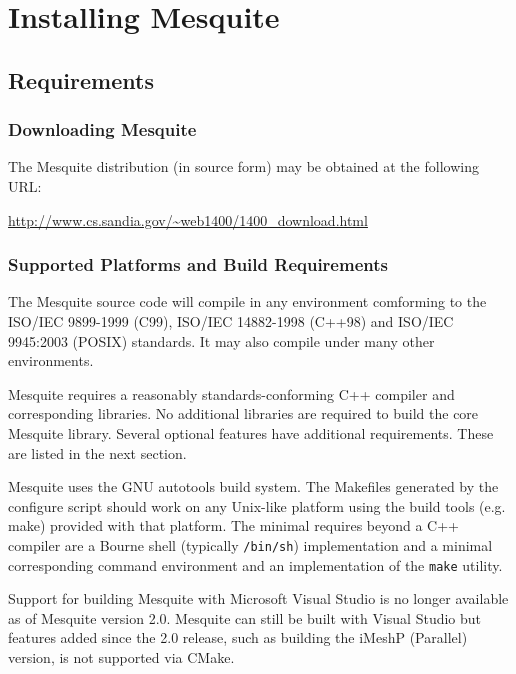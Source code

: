 \chapter{Installing Mesquite} \label{sec:install}

\section{Requirements}

\subsection{Downloading Mesquite}
The Mesquite distribution (in source form) may be obtained at the following URL:
\begin{center}
\url{http://www.cs.sandia.gov/~web1400/1400\_download.html}
\end{center}

\subsection{Supported Platforms and Build Requirements}
The Mesquite source code will compile in any environment comforming to the ISO/IEC 9899-1999 (C99), ISO/IEC 14882-1998 (C++98) and ISO/IEC 9945:2003 (POSIX) standards. It may also compile under many other environments.

Mesquite requires a reasonably standards-conforming C++ compiler and corresponding libraries.  No additional libraries are required to build the core Mesquite library. Several optional features have additional requirements.  These are listed in the next section.

Mesquite uses the GNU autotools build system.  The Makefiles generated by the
configure script should work on any Unix-like platform using the build tools
(e.g. make) provided with that platform.  The minimal requires beyond a C++
compiler are a Bourne shell (typically \texttt{/bin/sh}) implementation and
a minimal corresponding command environment and an implementation of the \texttt{make} utility.

Support for building Mesquite with Microsoft Visual Studio is no longer available as of Mesquite version 2.0.  Mesquite can still be built with Visual Studio but features added since the 2.0 release, such as building the iMeshP (Parallel) version, is not supported via CMake.


